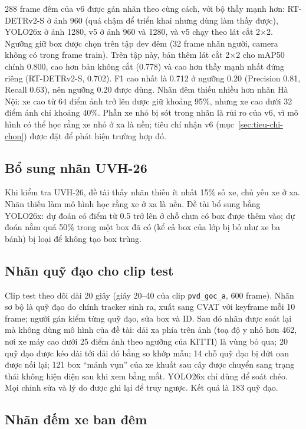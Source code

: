 288 frame đêm của v6 được gán nhãn theo cùng cách, với bộ thầy mạnh hơn: RT-DETRv2-S ở ảnh 960 (quá chậm để triển khai
nhưng dùng làm thầy được), YOLO26x ở ảnh 1280, v5 ở ảnh 960 và 1280, và v5
chạy theo lát cắt 2×2. Ngưỡng giữ box được chọn trên tập dev đêm (32 frame nhãn người, camera không có trong
frame train). Trên tập này, bản thêm lát cắt 2×2 cho mAP50 chính 0.800, cao hơn bản không cắt (0.778) và cao hơn thầy
mạnh nhất đứng riêng (RT-DETRv2-S, 0.702). F1 cao nhất là 0.712 ở ngưỡng 0.20 (Precision 0.81, Recall 0.63), nên ngưỡng
0.20 được dùng. Nhãn đêm thiếu nhiều hơn nhãn Hà Nội: xe cao từ 64 điểm ảnh trở lên được giữ khoảng 95\%, nhưng xe cao
dưới 32 điểm ảnh chỉ khoảng 40\%. Phần xe nhỏ bị sót trong nhãn là rủi ro của v6, vì mô hình có thể học rằng xe nhỏ ở
xa là nền; tiêu chí nhận v6 (mục~\ref{sec:tieu-chi-chon}) được đặt để phát hiện trường hợp đó.

\subsection{Bổ sung nhãn UVH-26}

Khi kiểm tra UVH-26, đề tài thấy nhãn thiếu ít nhất 15\% số xe, chủ yếu xe ở xa. Nhãn thiếu làm mô hình học rằng xe ở xa
là nền. Đề tài bổ sung bằng YOLO26x: dự đoán có điểm từ 0.5 trở lên ở chỗ chưa có box được thêm vào; dự đoán nằm quá
50\% trong một box đã có (kể cả box của lớp bị bỏ như xe ba bánh) bị loại để không tạo box trùng.

\subsection{Nhãn quỹ đạo cho clip test}

Clip test theo dõi dài 20 giây (giây 20--40 của clip \texttt{pvd\_goc\_a}, 600 frame). Nhãn sơ bộ là quỹ đạo do chính
tracker sinh ra, xuất sang CVAT với keyframe mỗi 10 frame; người gán kiểm từng quỹ đạo, sửa box và ID. Sau đó nhãn
được soát lại mà không dùng mô hình của đề tài: dải xa phía trên ảnh (toạ độ y nhỏ hơn 462, nơi xe máy cao dưới 25 điểm
ảnh theo ngưỡng của KITTI) là vùng bỏ qua; 20 quỹ đạo được kéo dài tới dải đó bằng so khớp mẫu; 14 chỗ quỹ đạo bị đứt
oan được nối lại; 121 box ``mảnh vụn'' của xe khuất sau cây được chuyển sang trạng thái không hiện diện sau khi xem
bằng mắt.
YOLO26x chỉ dùng để soát chéo. Mọi chỉnh sửa và lý do được ghi lại để truy ngược. Kết quả là 183 quỹ đạo.

\subsection{Nhãn đếm xe ban đêm}
\label{sec:nhan-dem}

